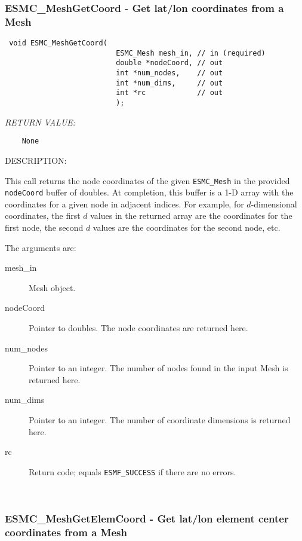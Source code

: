 \subsubsection [ESMC\_MeshGetCoord] {ESMC\_MeshGetCoord - Get lat/lon coordinates from a Mesh \label{sec:mesh:capi:meshgetcoord}}


  
\begin{verbatim} void ESMC_MeshGetCoord(
                          ESMC_Mesh mesh_in, // in (required)
                          double *nodeCoord, // out
                          int *num_nodes,    // out
                          int *num_dims,     // out
                          int *rc            // out
                          );\end{verbatim}{\em RETURN VALUE:}
\begin{verbatim}    None\end{verbatim}
{\sf DESCRIPTION:\\ }


  
   This call returns the node coordinates of the given {\tt ESMC\_Mesh}
   in the provided {\tt nodeCoord} buffer of doubles.  At completion, this
   buffer is a 1-D array with the coordinates for a given node
   in adjacent indices.  For example, for $d$-dimensional coordinates, the first
   $d$ values in the returned array are the coordinates for the first node,
   the second $d$ values are the coordinates for the second node, etc.
  
   The arguments are:
   \begin{description}
   \item[mesh\_in] Mesh object.
   \item[nodeCoord] Pointer to doubles.  The node coordinates are returned here.
   \item[num\_nodes] Pointer to an integer.  The number of nodes found in
   the input Mesh is returned here.
   \item[num\_dims] Pointer to an integer.  The number of coordinate dimensions
   is returned here.
   \item[rc] Return code; equals {\tt ESMF\_SUCCESS} if there are no
   errors.
   \end{description}
   
 
\mbox{}\hrulefill\ 
 
\subsubsection [ESMC\_MeshGetElemCoord] {ESMC\_MeshGetElemCoord - Get lat/lon element center coordinates from a Mesh \label{sec:mesh:capi:meshgetelemcoord}}


